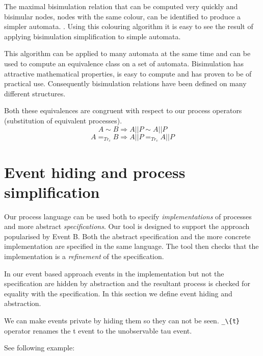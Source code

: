 \documentclass[]{article}
\begin{document}
 The maximal bisimulation relation that  can be computed very quickly and  bisimular nodes, nodes with the same colour, can be identified to produce a simpler automata. .
 Using this colouring algorithm it is easy to see the result of applying  bisimulation simplification to simple automata.

 This algorithm can be applied to many automata at the same time and can be used to compute an equivalence   class on a set of   automata.
 Bisimulation has  attractive mathematical properties, is easy to compute and has proven to be of practical use. Consequently bisimulation relations have been defined on many different structures.

Both these equivalences are congruent with respect to our process operators (substitution of equivalent processes).
\[ A\sim B \Rightarrow A||P\sim A||P\]
\[ A =_{Tr_{c}}  B  \Rightarrow  A||P =_{Tr_{c}}  A||P\]

\section{Event hiding and process simplification}
Our process language can be used both to specify \emph{implementations}  of  processes and more abstract \emph{specifications}.  Our tool is designed to support the approach popularised by Event B. Both the abstract specification and the more concrete implementation are specified in the same language.  The tool then checks that the implementation is a \emph{refinement} of the specification.

In our event based approach events in the implementation but not the specification are hidden by abstraction and the resultant process is checked for equality with the specification.  In this section we define event hiding and abstraction.



We can make events private  by  hiding them so they can not be seen.  \verb|_\{t}| operator renames the {\sf t} event to the unobservable  {\sf tau} event.

See following example:
\end{document}
